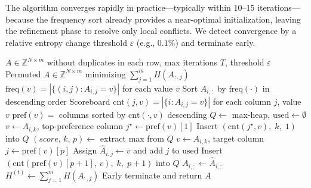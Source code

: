 The algorithm converges rapidly in practice---typically within 10--15
iterations---because the frequency sort already provides a near-optimal
initialization, leaving the refinement phase to resolve only local conflicts.
We detect convergence by a relative entropy change threshold $\varepsilon$
(e.g., $0.1\%$) and terminate early.




\begin{algorithm}[t]
\caption{CARAMELSort Heuristic (Draft)}
\label{alg:col-entropy}
\begin{algorithmic}
   $A \in \mathbb{Z}^{N \times m}$ without duplicates in each row, max iterations $T$, threshold $\varepsilon$
   Permuted $A \in \mathbb{Z}^{N \times m}$ minimizing $\sum_{j=1}^{m} H(A_{:,j})$
  \STATE $\mathrm{freq}(v) = |\{(i,j) : A_{i,j} = v\}|$ for each value $v$
    \STATE Sort $A_{i,:}$ by $\mathrm{freq}(\cdot)$ in descending order
  \ENDFOR
    \STATE Scoreboard $\mathrm{cnt}(j,v) = |\{i : A_{i,j} = v\}|$ for each column $j$, value $v$
      \STATE $\mathrm{pref}(v) = $ columns sorted by $\mathrm{cnt}(\cdot, v)$ descending
    \ENDFOR
      \STATE $Q \gets$ max-heap, $\mathrm{used} \gets \emptyset$
        \STATE $v \gets A_{i,k}$, top-preference column $j^{\star} \gets \mathrm{pref}(v)[1]$
        \STATE Insert $(\mathrm{cnt}(j^{\star}, v),\; k,\; 1)$ into $Q$
      \ENDFOR
        \STATE $(\mathit{score},\, k,\, p) \gets $ extract max from $Q$
        \STATE $v \gets A_{i,k}$, target column $j \gets \mathrm{pref}(v)[p]$
          \STATE Assign $\hat{A}_{i,j} \gets v$ and add $j$ to $\mathrm{used}$
        \ELSE
          \STATE Insert $(\mathrm{cnt}(\mathrm{pref}(v)[p\!+\!1],\, v),\; k,\; p\!+\!1)$ into $Q$
        \ENDIF
      \ENDWHILE
      \STATE $A_{i,:} \gets \hat{A}_{i,:}$
    \ENDFOR
    \STATE $H^{(t)} \gets \sum_{j=1}^{m} H(A_{:,j})$
      \STATE Early terminate and return $A$
    \ENDIF
  \ENDFOR
\end{algorithmic}
\end{algorithm}




